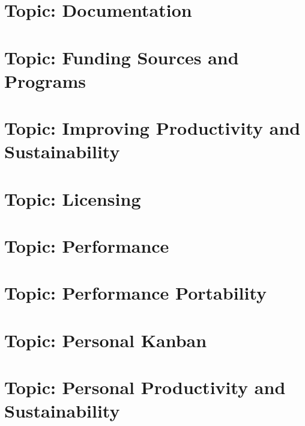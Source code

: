 \documentclass[twoside]{book}
\newcommand{\+}{\discretionary{\mbox{\scriptsize$\hookleftarrow$}}{}{}}
\begin{document}
\chapter{Topic\+: Documentation}
\label{md_markdown_topic_documentation}

\chapter{Topic\+: Funding Sources and Programs}
\label{md_markdown_topic_funding_sources_and_programs}

\chapter{Topic\+: Improving Productivity and Sustainability}
\label{md_markdown_topic_improving_productivity_and_sustanability}

\chapter{Topic\+: Licensing}
\label{md_markdown_topic_licensing}

\chapter{Topic\+: Performance}
\label{md_markdown_topic_performance}

\chapter{Topic\+: Performance Portability}
\label{md_markdown_topic_performance_portability}

\chapter{Topic\+: Personal Kanban}
\label{md_markdown_topic_personal_kanban}

\chapter{Topic\+: Personal Productivity and Sustainability}
\label{md_markdown_topic_personal_productivity_and_sustainability}

\end{document}
